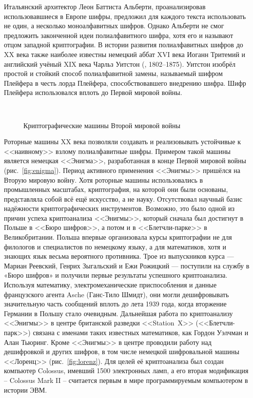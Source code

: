 Итальянский архитектор Леон Баттиста Альберти, проанализировав использовавшиеся в Европе шифры, предложил для каждого текста использовать не один, а несколько моноалфавитных шифров. Однако Альберти не смог предложить законченной идеи полиалфавитного шифра, хотя его и называют отцом западной криптографии. В истории развития полиалфавитных шифров до XX века также наиболее известны немецкий аббат XVI века Иоганн Тритемий и английский учёный XIX века Чарльз Уитстон (, 1802--1875). Уитстон изобрёл простой и стойкий способ полиалфавитной замены, называемый шифром Плейфера в честь лорда Плейфера, способствовавшего внедрению шифра. Шифр Плейфера использовался вплоть до Первой мировой войны.

\begin{figure}[t]
	\centering
	~~
	\caption{Криптографические машины Второй мировой войны}
\end{figure}

Роторные машины XX века позволяли создавать и реализовывать устойчивые к <<наивному>> взлому полиалфавитные шифры. Примером такой машины является немецкая <<Энигма>>, разработанная в конце Первой мировой войны (рис.~\ref{fig:enigma}). Период активного применения <<Энигмы>> пришёлся на Вторую мировую войну. Хотя роторные машины использовались в промышленных масштабах, криптография, на которой они были основаны, представляла собой всё ещё искусство, а не науку. Отсутствовал научный базис надёжности криптографических инструментов. Возможно, это было одной из причин успеха криптоанализа <<Энигмы>>, который сначала был достигнут в Польше в <<Бюро шифров>>, а потом и в <<Блетчли-парке>> в Великобритании. Польша впервые организовала курсы криптографии не для филологов и специалистов по немецкому языку, а для математиков, хотя и знающих язык весьма вероятного противника. Трое из выпускников курса — Мариан Реевский, Генрих Зыгальский и Ежи Рожицкий — поступили на службу в «Бюро шифров» и получили первые результаты успешного криптоанализа. Используя математику, электромеханические приспособления и данные французского агента Asche (Ганс-Тило Шмидт), они могли дешифровывать значительную часть сообщений вплоть до лета 1939 года, когда вторжение Германии в Польшу стало очевидным. Дальнейшая работа по криптоанализу <<Энигмы>> в центре британской разведки <<Station~X>> (<<Блетчли-парк>>) связана с именами таких известных математиков, как Гордон Уэлчман и Алан Тьюринг. Кроме <<Энигмы>> в центре проводили работу над дешифровкой и других шифров, в том числе немецкой шифровальной машины <<Лоренц>> (рис.~\ref{fig:lorenz}). Для целей её криптоанализа был создан компьютер Colossus, имевший 1500 электронных ламп, а его вторая модификация -- Colossus Mark II -- считается первым в мире программируемым компьютером в истории ЭВМ.

